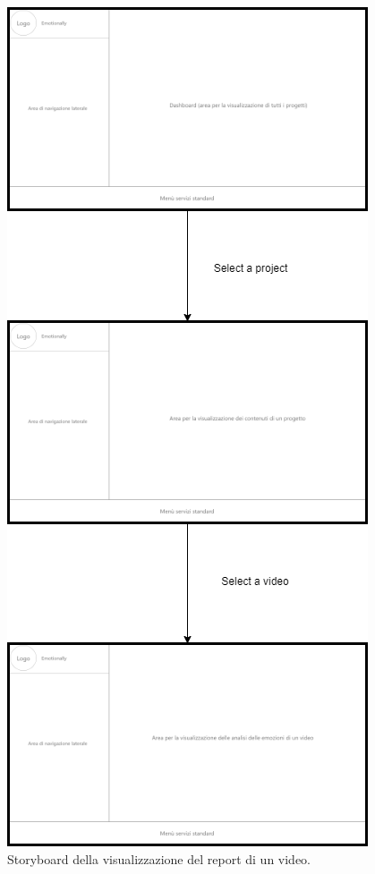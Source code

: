 \begin{figure}[H]
	\centering
	\caption{Storyboard della visualizzazione del report di un video.}
	\label{fig:storyboard:report-video}
	\includegraphics[height=\textheight-3ex]{images/storyboard/report-video}
\end{figure}

